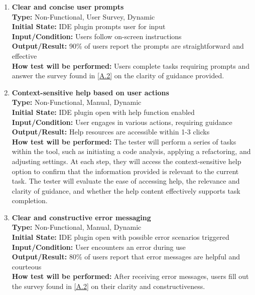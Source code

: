 \documentclass[12pt, titlepage]{article}
\begin{document}
\begin{enumerate}[label={\bf \textcolor{Maroon}{test-UH-\arabic*}},
    wide=0pt, font=\itshape]
    \item \textbf{Clear and concise user prompts} \\[2mm]
      \textbf{Type:} Non-Functional, User Survey, Dynamic \\
      \textbf{Initial State:} IDE plugin prompts user for input \\
      \textbf{Input/Condition:} Users follow on-screen instructions \\
      \textbf{Output/Result:} 90\% of users report the prompts are
      straightforward and effective \\[2mm]
      \textbf{How test will be performed:} Users complete tasks
      requiring prompts and answer the survey found in \ref{A.2} on
      the clarity of guidance provided.

    \item \textbf{Context-sensitive help based on user actions} \\[2mm]
      \textbf{Type:} Non-Functional, Manual, Dynamic \\
      \textbf{Initial State:} IDE plugin open with help function enabled \\
      \textbf{Input/Condition:} User engages in various actions,
      requiring guidance \\
      \textbf{Output/Result:} Help resources are accessible within
      1-3 clicks \\[2mm]
      \textbf{How test will be performed:} The tester will perform a
      series of tasks within the tool, such as initiating a code
      analysis, applying a refactoring, and adjusting settings. At
      each step, they will access the context-sensitive help option
      to confirm that the information provided is relevant to the
      current task. The tester will evaluate the ease of accessing
      help, the relevance and clarity of guidance, and whether the
      help content effectively supports task completion.

    \item \textbf{Clear and constructive error messaging} \\[2mm]
      \textbf{Type:} Non-Functional, Manual, Dynamic \\
      \textbf{Initial State:} IDE plugin open with possible error
      scenarios triggered \\
      \textbf{Input/Condition:} User encounters an error during use \\
      \textbf{Output/Result:} 80\% of users report that error
      messages are helpful and courteous \\[2mm]
      \textbf{How test will be performed:} After receiving error
      messages, users fill out the survey found in \ref{A.2} on their
      clarity and constructiveness.
  \end{enumerate}
\end{document}
